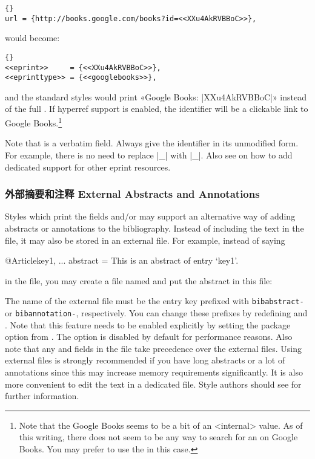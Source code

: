 \begin{lstlisting}[style=bibtex]{}
url = {http://books.google.com/books?id=<<XXu4AkRVBBoC>>},
\end{lstlisting}
%
would become:

\begin{lstlisting}[style=bibtex]{}
<<eprint>>     = {<<XXu4AkRVBBoC>>},
<<eprinttype>> = {<<googlebooks>>},
\end{lstlisting}
%
and the standard styles would print «Google Books: |XXu4AkRVBBoC|» instead of the full . If hyperref support is enabled, the identifier will be a clickable link to Google Books.\footnote{Note that the Google Books  seems to be a bit of an <internal> value. As of this writing, there does not seem to be any way to search for an  on Google Books. You may prefer to use the  in this case.}

Note that  is a verbatim field. Always give the identifier in its unmodified form. For example, there is no need to replace |_| with |\_|. Also see  on how to add dedicated support for other eprint resources.

\subsubsection{外部摘要和注释 External Abstracts and Annotations}
\label{use:use:prf}

Styles which print the fields  and\slash or  may support an alternative way of adding abstracts or annotations to the bibliography. Instead of including the text in the  file, it may also be stored in an external \latex file. For example, instead of saying

\begin{ltxexample}[style=bibtex]
@Article{key1,
  ...
  abstract	  = {This is an abstract of entry `key1'.}
}
\end{ltxexample}
%
in the  file, you may create a file named  and put the abstract in this file:

%
The name of the external file must be the entry key prefixed with \texttt{bibabstract-} or \texttt{bibannotation-}, respectively. You can change these prefixes by redefining  and . Note that this feature needs to be enabled explicitly by setting the package option  from . The option is disabled by default for performance reasons. Also note that any  and  fields in the  file take precedence over the external files. Using external files is strongly recommended if you have long abstracts or a lot of annotations since this may increase memory requirements significantly. It is also more convenient to edit the text in a dedicated \latex file. Style authors should see  for further information.

